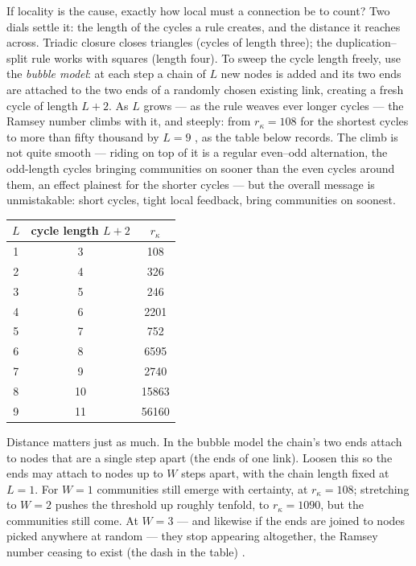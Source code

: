 If locality is the cause, exactly how local must a connection be to count? Two
dials settle it: the length of the cycles a rule creates, and the distance it
reaches across. Triadic closure closes triangles (cycles of length three); the
duplication--split rule works with squares (length four). To sweep the cycle
length freely, use the \emph{bubble model}: at each step a chain of $L$ new nodes
is added and its two ends are attached to the two ends of a randomly chosen
existing link, creating a fresh cycle of length $L+2$. As $L$ grows --- as the
rule weaves ever longer cycles --- the Ramsey number climbs with it, and steeply:
from $r_\kappa=108$ for the shortest cycles to more than fifty thousand by $L=9$
\citep{vazquezcommunities2025}, as the table below records. The climb is not quite
smooth --- riding on top of it is a regular even--odd alternation, the odd-length
cycles bringing communities on sooner than the even cycles around them, an effect
plainest for the shorter cycles --- but the overall message is unmistakable: short
cycles, tight local feedback, bring communities on soonest.

\begin{center}
\begin{tabular}{ccc}
\hline
$L$ & cycle length $L+2$ & $r_\kappa$ \\
\hline
1 & 3  & 108 \\
2 & 4  & 326 \\
3 & 5  & 246 \\
4 & 6  & 2201 \\
5 & 7  & 752 \\
6 & 8  & 6595 \\
7 & 9  & 2740 \\
8 & 10 & 15863 \\
9 & 11 & 56160 \\
\hline
\end{tabular}
\end{center}

Distance matters just as much. In the bubble model the chain's two ends attach to
nodes that are a single step apart (the ends of one link). Loosen this so the
ends may attach to nodes up to $W$ steps apart, with the chain length fixed at
$L=1$. For $W=1$ communities still emerge with certainty, at $r_\kappa=108$;
stretching to $W=2$ pushes the threshold up roughly tenfold, to $r_\kappa=1090$,
but the communities still come. At $W=3$ --- and likewise if the ends are joined
to nodes picked anywhere at random --- they stop appearing altogether, the Ramsey
number ceasing to exist (the dash in the table) \citep{vazquezcommunities2025}.

